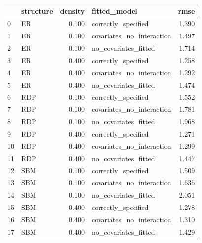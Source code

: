 \begin{tabular}{llrlr}
\toprule
 & structure & density & fitted_model & rmse \\
\midrule
0 & ER & 0.100 & correctly_specified & 1.390 \\
1 & ER & 0.100 & covariates_no_interaction & 1.497 \\
2 & ER & 0.100 & no_covariates_fitted & 1.714 \\
3 & ER & 0.400 & correctly_specified & 1.258 \\
4 & ER & 0.400 & covariates_no_interaction & 1.292 \\
5 & ER & 0.400 & no_covariates_fitted & 1.474 \\
6 & RDP & 0.100 & correctly_specified & 1.552 \\
7 & RDP & 0.100 & covariates_no_interaction & 1.781 \\
8 & RDP & 0.100 & no_covariates_fitted & 1.968 \\
9 & RDP & 0.400 & correctly_specified & 1.271 \\
10 & RDP & 0.400 & covariates_no_interaction & 1.299 \\
11 & RDP & 0.400 & no_covariates_fitted & 1.447 \\
12 & SBM & 0.100 & correctly_specified & 1.509 \\
13 & SBM & 0.100 & covariates_no_interaction & 1.636 \\
14 & SBM & 0.100 & no_covariates_fitted & 2.051 \\
15 & SBM & 0.400 & correctly_specified & 1.278 \\
16 & SBM & 0.400 & covariates_no_interaction & 1.310 \\
17 & SBM & 0.400 & no_covariates_fitted & 1.429 \\
\bottomrule
\end{tabular}
